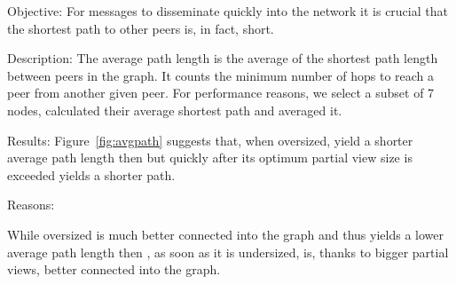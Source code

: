 \begin{asparadesc}
\item[Objective:] 
    For messages to disseminate quickly into the network it is crucial 
    that the shortest path to other peers is, in fact, short.
\item[Description:] 
    The average path length is the average of the shortest path
  length between peers in the graph. It counts the minimum number of hops to
  reach a peer from another given peer.
  For performance reasons, we select a subset of 7 nodes, calculated their
  average shortest path and averaged it.
\item[Results:
    Figure~\ref{fig:avgpath}] suggests that\CYCLON{}, when oversized, yield a shorter average path length then \SCAMPLON{}
    but quickly after its optimum partial view size is exceeded \SCAMPLON{} yields a shorter path.

\item[Reasons:]

    While oversized \CYCLON{} is much better connected into the graph and thus yields a lower average path 
    length then \SCAMPLON, as soon as it is undersized, \SCAMPLON{} is, thanks to bigger partial views, 
    better connected into the graph.

\end{asparadesc}

